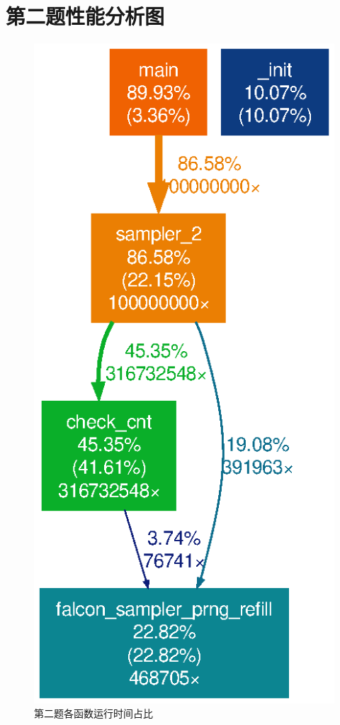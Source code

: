 \documentclass{article}
\begin{document}
    \section{第二题性能分析图}
    \begin{figure}[h!]
        \centering
        \includegraphics[width=.6\textwidth]{../gprof_figs/sampler_2.eps}
        \caption{第二题各函数运行时间占比}
    \end{figure}

    \newpage
\end{document}
